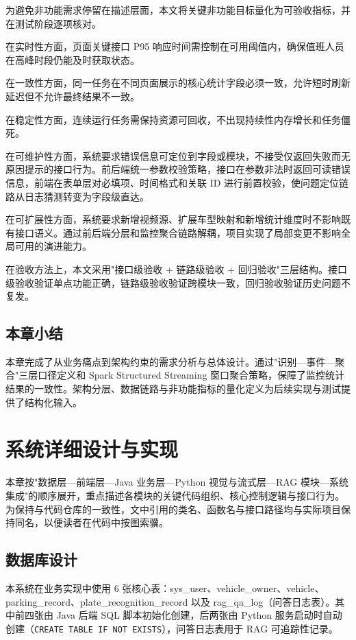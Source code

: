 \documentclass{wzuthesis} %
\begin{document}
为避免非功能需求停留在描述层面，本文将关键非功能目标量化为可验收指标，并在测试阶段逐项核对。

在实时性方面，页面关键接口 P95 响应时间需控制在可用阈值内，确保值班人员在高峰时段仍能及时获取状态。

在一致性方面，同一任务在不同页面展示的核心统计字段必须一致，允许短时刷新延迟但不允许最终结果不一致。

在稳定性方面，连续运行任务需保持资源可回收，不出现持续性内存增长和任务僵死。

在可维护性方面，系统要求错误信息可定位到字段或模块，不接受仅返回失败而无原因提示的接口行为。前后端统一参数校验策略，接口在参数非法时返回可读错误信息，前端在表单层对必填项、时间格式和关联 ID 进行前置校验，使问题定位链路从日志猜测转变为字段级直达。

在可扩展性方面，系统要求新增视频源、扩展车型映射和新增统计维度时不影响既有接口语义。通过前后端分层和监控聚合链路解耦，项目实现了局部变更不影响全局可用的演进能力。

在验收方法上，本文采用"接口级验收 + 链路级验收 + 回归验收"三层结构。接口级验收验证单点功能正确，链路级验收验证跨模块一致，回归验收验证历史问题不复发。

\section{本章小结}

本章完成了从业务痛点到架构约束的需求分析与总体设计。通过"识别—事件—聚合"三层口径定义和 Spark Structured Streaming 窗口聚合策略，保障了监控统计结果的一致性。架构分层、数据链路与非功能指标的量化定义为后续实现与测试提供了结构化输入。



\chapter{系统详细设计与实现}

本章按"数据层—前端层—Java 业务层—Python 视觉与流式层—RAG 模块—系统集成"的顺序展开，重点描述各模块的关键代码组织、核心控制逻辑与接口行为。为保持与代码仓库的一致性，文中引用的类名、函数名与接口路径均与实际项目保持同名，以便读者在代码中按图索骥。

\section{数据库设计}

本系统在业务实现中使用 6 张核心表：sys\_user、vehicle\_owner、vehicle、parking\_record、plate\_recognition\_record 以及 rag\_qa\_log（问答日志表）。其中前四张由 Java 后端 SQL 脚本初始化创建，后两张由 Python 服务启动时自动创建（\texttt{CREATE TABLE IF NOT EXISTS}），问答日志表用于 RAG 可追踪性记录。
\end{document}
